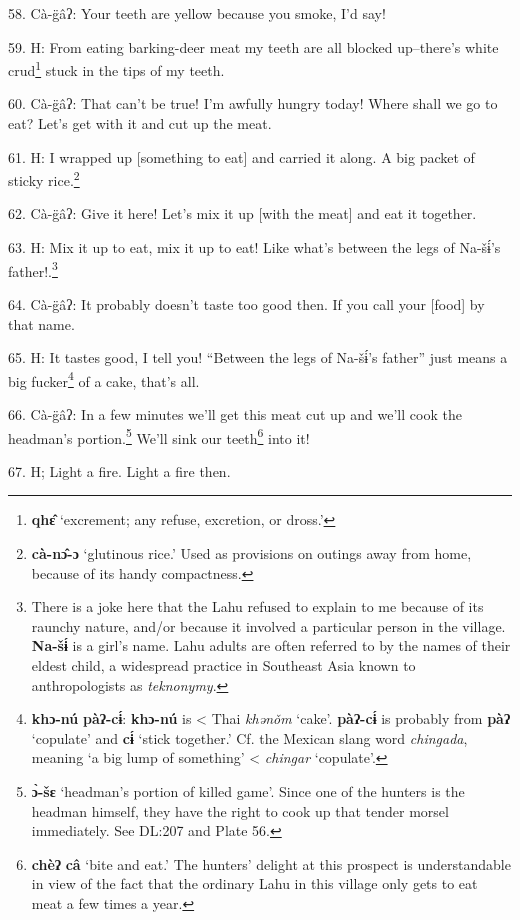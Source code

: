 58. Cà-g̈âʔ: Your teeth are yellow because you smoke, I'd say!

59. H: From eating barking-deer meat my teeth are all blocked up--there's white
crud\footnote{\textbf{qhɛ̂} `excrement; any refuse, excretion, or dross.'} stuck in the tips of my teeth.

60. Cà-g̈âʔ: That can't be true! I'm awfully hungry today! Where shall we go
to eat? Let's get with it and cut up the meat.

61. H: I wrapped up [something to eat] and carried it along. A big packet of sticky
rice.\footnote{\textbf{cà-nɔ̂-ɔ} `glutinous rice.' Used as provisions on outings away from home, because of its handy compactness.}

62. Cà-g̈âʔ: Give it here! Let's mix it up [with the meat] and eat it together.

63. H: Mix it up to eat, mix it up to eat! Like what's between the legs of Na-šɨ́'s
father!.\footnote{There is a joke here that the Lahu refused to explain to me because of its raunchy nature, and/or because it involved a particular person in the village. \textbf{Na-šɨ́} is a girl's name. Lahu adults are often referred to by the names of their eldest child, a widespread practice in Southeast Asia known to anthropologists as \textit{teknonymy}.}


64. Cà-g̈âʔ: It probably doesn't taste too good then. If you call your [food]
by that name.

65. H: It tastes good, I tell you! ``Between the legs of Na-šɨ́'s father''
just means a big fucker\footnote{\textbf{khɔ-nú} \textbf{pàʔ-cɨ́}: \textbf{khɔ-nú} is < Thai \textit{khənǒm} `cake'. \textbf{pàʔ-cɨ́} is probably from \textbf{pàʔ} `copulate' and \textbf{cɨ́} `stick together.' Cf. the Mexican slang word \textit{chingada}, meaning `a big lump of something' < \textit{chingar} `copulate'.} of a cake, that's all.

66. Cà-g̈âʔ: In a few minutes we'll get this meat cut up and we'll cook the
headman's portion.\footnote{\textbf{ɔ̀-šɛ} `headman's portion of killed game'. Since one of the hunters is the headman himself, they have the right to cook up that tender morsel immediately. See DL:207 and Plate 56.} We'll sink our teeth\footnote{\textbf{chèʔ} \textbf{câ} `bite and eat.' The hunters' delight at this prospect is understandable in view of the fact that the ordinary Lahu in this village only gets to eat meat a few times a year.} into it!

67. H; Light a fire. Light a fire then.

